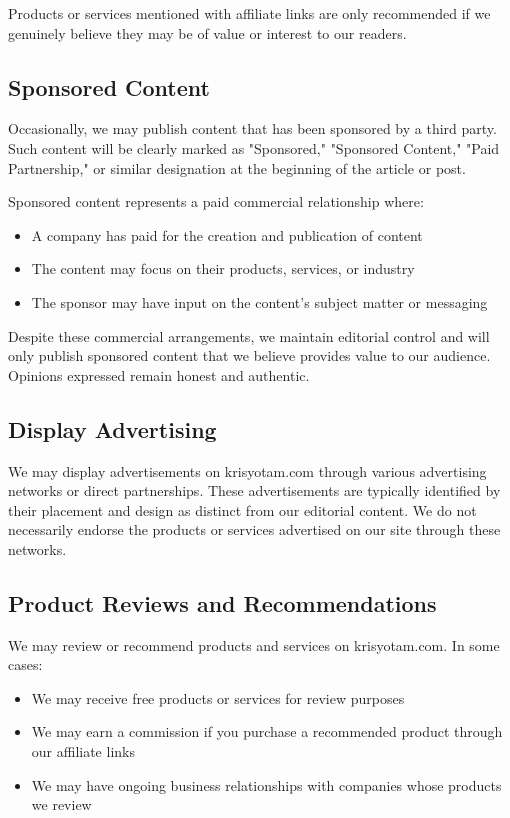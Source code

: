 \documentclass[11pt]{article}
\begin{document}
Products or services mentioned with affiliate links are only recommended if we genuinely believe they may be of value or interest to our readers.

\subsection{Sponsored Content}
Occasionally, we may publish content that has been sponsored by a third party. Such content will be clearly marked as "Sponsored," "Sponsored Content," "Paid Partnership," or similar designation at the beginning of the article or post.

Sponsored content represents a paid commercial relationship where:
\begin{itemize}
  \item A company has paid for the creation and publication of content
  \item The content may focus on their products, services, or industry
  \item The sponsor may have input on the content's subject matter or messaging
\end{itemize}

Despite these commercial arrangements, we maintain editorial control and will only publish sponsored content that we believe provides value to our audience. Opinions expressed remain honest and authentic.

\subsection{Display Advertising}
We may display advertisements on krisyotam.com through various advertising networks or direct partnerships. These advertisements are typically identified by their placement and design as distinct from our editorial content. We do not necessarily endorse the products or services advertised on our site through these networks.

\subsection{Product Reviews and Recommendations}
We may review or recommend products and services on krisyotam.com. In some cases:
\begin{itemize}
  \item We may receive free products or services for review purposes
  \item We may earn a commission if you purchase a recommended product through our affiliate links
  \item We may have ongoing business relationships with companies whose products we review
\end{itemize}
\end{document}
